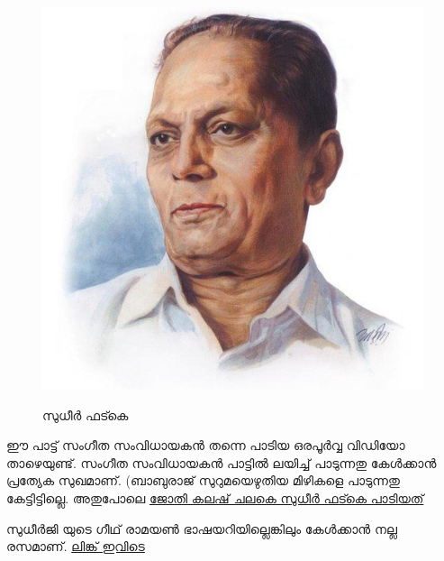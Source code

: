 \documentclass[10pt,a4paper]{report}
\begin{document}
 \begin{figure}[H]
  \center
\includegraphics[scale=.25]{images/sudhir}
\label{sudhir}
\caption{ സുധീർ ഫട്കെ  }
\end{figure}
ഈ പാട്ട് സംഗീത സംവിധായകൻ തന്നെ പാടിയ ഒരപൂർവ്വ വിഡിയോ താഴെയുണ്ട്. സംഗീത സംവിധായകൻ പാട്ടിൽ ലയിച്ച് പാടുന്നതു കേൾക്കാൻ പ്രത്യേക സുഖമാണ്. (ബാബുരാജ് സുറുമയെഴുതിയ മിഴികളെ പാടുന്നതു കേട്ടിട്ടില്ലെ. അതുപോലെ
\href{https://youtu.be/FykYiZ2cOcw}{ജോതി കലഷ് ചലകെ സുധീർ ഫട്കെ പാടിയത്}


സുധീർജി യുടെ ഗീഥ് രാമയൺ ഭാഷയറിയില്ലെങ്കിലും കേൾക്കാൻ നല്ല രസമാണ്. \href{https://youtu.be/1yvZUmC34Q8}{ലിങ്ക് ഇവിടെ }
\end{document}
